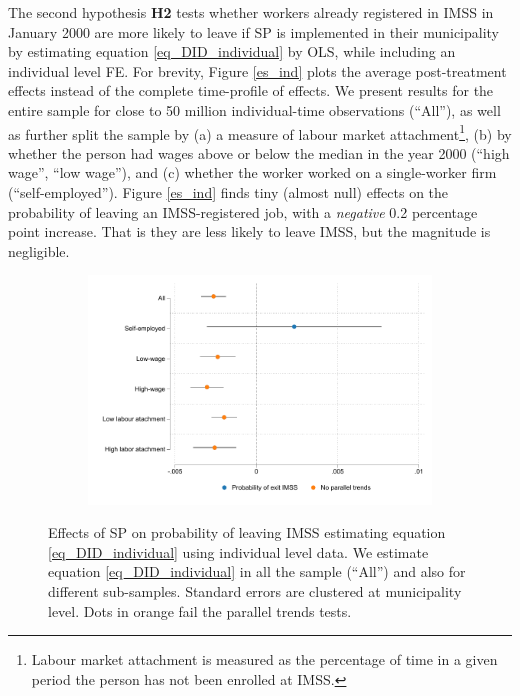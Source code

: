 \documentclass[oneside,11pt]{article}
\begin{document}
The second hypothesis \textbf{H2} tests whether workers already registered in IMSS in January 2000 are more likely to leave if SP is implemented in their municipality by estimating equation \ref{eq_DID_individual} by OLS, while including an individual level FE. For brevity, Figure \ref{es_ind} plots the average post-treatment effects instead of the complete time-profile of effects. We present results for the entire sample for close to 50 million individual-time observations (``All''), as well as further split the sample by (a) a measure of labour market attachment\footnote{Labour market attachment is measured as the percentage of time in a given period the person has not been enrolled at IMSS.}, (b) by whether the person had wages above or below the median in the year 2000 (``high wage'', ``low wage''), and (c) whether the worker worked on a single-worker firm (``self-employed''). Figure \ref{es_ind} finds tiny (almost null) effects on the probability of leaving an IMSS-registered job, with a \textit{negative} 0.2 percentage point increase. That is they are less likely to leave IMSS, but the magnitude is negligible.


\begin{figure}[H]
     \caption{Effect on the worker level probability of abandoning IMSS}
    \label{es_ind}
\begin{center}
       \begin{subfigure}{0.65\textwidth}
        \includegraphics[width=\textwidth]{Figuras/did_imss.pdf}
    \end{subfigure}
  \end{center}
    \scriptsize 
    
Effects of SP on probability of leaving IMSS estimating equation \ref{eq_DID_individual} using individual level data. %
We estimate equation \ref{eq_DID_individual} in all the sample (``All'') and also for different sub-samples. 
Standard errors are clustered at municipality level. Dots in orange fail the parallel trends tests.

\end{figure}
\end{document}
